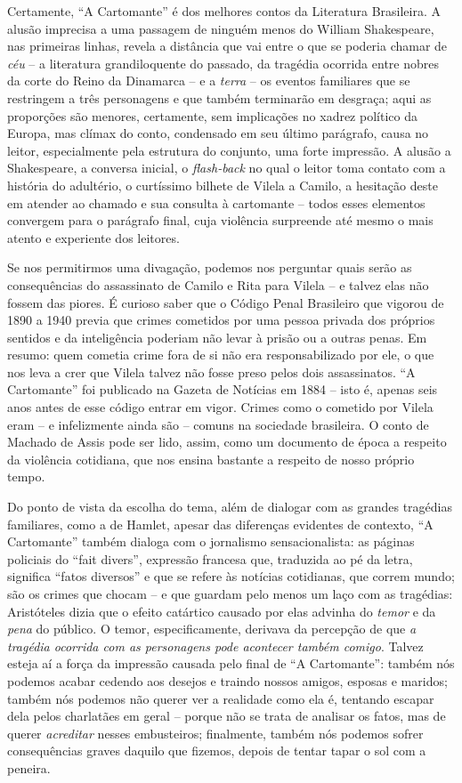 \documentclass{extarticle}
\begin{document}
Certamente, ``A Cartomante'' é dos melhores contos da Literatura
Brasileira. A alusão imprecisa a uma passagem de ninguém menos do
William Shakespeare, nas primeiras linhas, revela a distância que vai
entre o que se poderia chamar de \emph{céu} -- a literatura
grandiloquente do passado, da tragédia ocorrida entre nobres da corte do
Reino da Dinamarca -- e a \emph{terra} -- os eventos familiares que se
restringem a três personagens e que também terminarão em desgraça; aqui
as proporções são menores, certamente, sem implicações no xadrez
político da Europa, mas clímax do conto, condensado em seu último
parágrafo, causa no leitor, especialmente pela estrutura do conjunto,
uma forte impressão. A alusão a Shakespeare, a conversa inicial, o
\emph{flash-back} no qual o leitor toma contato com a história do
adultério, o curtíssimo bilhete de Vilela a Camilo, a hesitação deste em
atender ao chamado e sua consulta à cartomante -- todos esses elementos
convergem para o parágrafo final, cuja violência surpreende até mesmo o
mais atento e experiente dos leitores.

Se nos permitirmos uma divagação, podemos nos perguntar quais serão as
consequências do assassinato de Camilo e Rita para Vilela -- e talvez
elas não fossem das piores. É curioso saber que o Código Penal
Brasileiro que vigorou de 1890 a 1940 previa que crimes cometidos por
uma pessoa privada dos próprios sentidos e da inteligência poderiam não
levar à prisão ou a outras penas. Em resumo: quem cometia crime fora de
si não era responsabilizado por ele, o que nos leva a crer que Vilela
talvez não fosse preso pelos dois assassinatos. ``A Cartomante'' foi
publicado na Gazeta de Notícias em 1884 -- isto é, apenas seis anos
antes de esse código entrar em vigor. Crimes como o cometido por Vilela
eram -- e infelizmente ainda são -- comuns na sociedade brasileira. O
conto de Machado de Assis pode ser lido, assim, como um documento de
época a respeito da violência cotidiana, que nos ensina bastante a
respeito de nosso próprio tempo.

Do ponto de vista da escolha do tema, além de dialogar com as grandes
tragédias familiares, como a de Hamlet, apesar das diferenças evidentes
de contexto, ``A Cartomante'' também dialoga com o jornalismo
sensacionalista: as páginas policiais do ``fait divers'', expressão
francesa que, traduzida ao pé da letra, significa ``fatos diversos'' e
que se refere às notícias cotidianas, que correm mundo; são os crimes
que chocam -- e que guardam pelo menos um laço com as tragédias:
Aristóteles dizia que o efeito catártico causado por elas advinha do
\emph{temor} e da \emph{pena} do público. O temor, especificamente,
derivava da percepção de que \emph{a tragédia ocorrida com as
personagens pode acontecer também comigo}. Talvez esteja aí a força da
impressão causada pelo final de ``A Cartomante'': também nós podemos
acabar cedendo aos desejos e traindo nossos amigos, esposas e maridos;
também nós podemos não querer ver a realidade como ela é, tentando
escapar dela pelos charlatães em geral -- porque não se trata de
analisar os fatos, mas de querer \emph{acreditar} nesses embusteiros;
finalmente, também nós podemos sofrer consequências graves daquilo que
fizemos, depois de tentar tapar o sol com a peneira.
\end{document}
